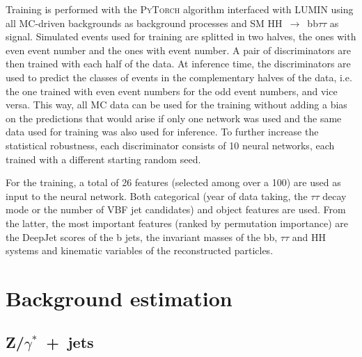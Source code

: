\documentclass[../main.tex]{subfiles}
\begin{document}
Training is performed with the \textsc{PyTorch} \cite{hh:analysis:pytorch} algorithm interfaced with \textsc{LUMIN} \cite{hh:analysis:lumin} using all MC-driven backgrounds as background processes and SM HH~$\to$~bb$\tau\tau$ as signal. Simulated events used for training are splitted in two halves, the ones with even event number and the ones with event number. A pair of discriminators are then trained with each half of the data. At inference time, the discriminators are used to predict the classes of events in the complementary halves of the data, i.e. the one trained with even event numbers for the odd event numbers, and vice versa. This way, all MC data can be used for the training without adding a bias on the predictions that would arise if only one network was used and the same data used for training was also used for inference. To further increase the statistical robustness, each discriminator consists of 10 neural networks, each trained with a different starting random seed.

For the training, a total of 26 features (selected among over a 100) are used as input to the neural network. Both categorical (year of data taking, the $\tau\tau$ decay mode or the number of VBF jet candidates) and object features are used. From the latter, the most important features (ranked by permutation importance) are the DeepJet scores of the b jets, the invariant masses of the bb, $\tau\tau$ and HH systems and kinematic variables of the reconstructed particles.







\section{Background estimation}
\label{hh:sec:background}






\subsection{Z/$\gamma^*$~+~jets}
\label{hh:subsec:dy}
\end{document}
